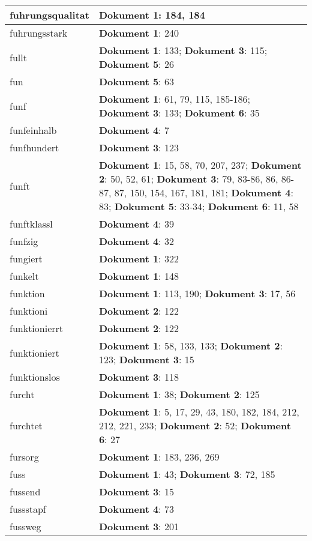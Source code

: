 \documentclass[a5paper]{article}
\begin{document}
\begin{longtable}[l]{|l|p{3in}|}
fuhrungsqualitat & \textbf{Dokument 1}: 184, 184 \\
\hline
fuhrungsstark & \textbf{Dokument 1}: 240 \\
\hline
fullt & \textbf{Dokument 1}: 133; \textbf{Dokument 3}: 115; \textbf{Dokument 5}: 26 \\
\hline
fun & \textbf{Dokument 5}: 63 \\
\hline
funf & \textbf{Dokument 1}: 61, 79, 115, 185-186; \textbf{Dokument 3}: 133; \textbf{Dokument 6}: 35 \\
\hline
funfeinhalb & \textbf{Dokument 4}: 7 \\
\hline
funfhundert & \textbf{Dokument 3}: 123 \\
\hline
funft & \textbf{Dokument 1}: 15, 58, 70, 207, 237; \textbf{Dokument 2}: 50, 52, 61; \textbf{Dokument 3}: 79, 83-86, 86, 86-87, 87, 150, 154, 167, 181, 181; \textbf{Dokument 4}: 83; \textbf{Dokument 5}: 33-34; \textbf{Dokument 6}: 11, 58 \\
\hline
funftklassl & \textbf{Dokument 4}: 39 \\
\hline
funfzig & \textbf{Dokument 4}: 32 \\
\hline
fungiert & \textbf{Dokument 1}: 322 \\
\hline
funkelt & \textbf{Dokument 1}: 148 \\
\hline
funktion & \textbf{Dokument 1}: 113, 190; \textbf{Dokument 3}: 17, 56 \\
\hline
funktioni & \textbf{Dokument 2}: 122 \\
\hline
funktionierrt & \textbf{Dokument 2}: 122 \\
\hline
funktioniert & \textbf{Dokument 1}: 58, 133, 133; \textbf{Dokument 2}: 123; \textbf{Dokument 3}: 15 \\
\hline
funktionslos & \textbf{Dokument 3}: 118 \\
\hline
furcht & \textbf{Dokument 1}: 38; \textbf{Dokument 2}: 125 \\
\hline
furchtet & \textbf{Dokument 1}: 5, 17, 29, 43, 180, 182, 184, 212, 212, 221, 233; \textbf{Dokument 2}: 52; \textbf{Dokument 6}: 27 \\
\hline
fursorg & \textbf{Dokument 1}: 183, 236, 269 \\
\hline
fuss & \textbf{Dokument 1}: 43; \textbf{Dokument 3}: 72, 185 \\
\hline
fussend & \textbf{Dokument 3}: 15 \\
\hline
fussstapf & \textbf{Dokument 4}: 73 \\
\hline
fussweg & \textbf{Dokument 3}: 201 \\

\end{longtable}
\end{document}
